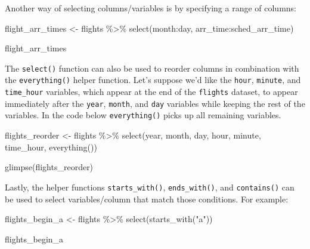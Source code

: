 \documentclass[
  letterpaper,
  DIV=11,
  numbers=noendperiod]{scrreprt}
\newenvironment{Shaded}{\begin{snugshade}}{\end{snugshade}}
\newcommand{\FunctionTok}[1]{\textcolor[rgb]{0.28,0.35,0.67}{#1}}
\newcommand{\NormalTok}[1]{\textcolor[rgb]{0.00,0.23,0.31}{#1}}
\newcommand{\OtherTok}[1]{\textcolor[rgb]{0.00,0.23,0.31}{#1}}
\newcommand{\SpecialCharTok}[1]{\textcolor[rgb]{0.37,0.37,0.37}{#1}}
\newcommand{\StringTok}[1]{\textcolor[rgb]{0.13,0.47,0.30}{#1}}
\theoremstyle{definition}
\theoremstyle{remark}
\begin{document}
Another way of selecting columns/variables is by specifying a range of
columns:

\begin{Shaded}
\begin{Highlighting}[]
\NormalTok{flight\_arr\_times }\OtherTok{\textless{}{-}}\NormalTok{ flights }\SpecialCharTok{\%\textgreater{}\%} 
  \FunctionTok{select}\NormalTok{(month}\SpecialCharTok{:}\NormalTok{day, arr\_time}\SpecialCharTok{:}\NormalTok{sched\_arr\_time)}

\NormalTok{flight\_arr\_times}
\end{Highlighting}
\end{Shaded}

The \texttt{select()} function can also be used to reorder columns in
combination with the \texttt{everything()} helper function. Let's
suppose we'd like the \texttt{hour}, \texttt{minute}, and
\texttt{time\_hour} variables, which appear at the end of the
\texttt{flights} dataset, to appear immediately after the \texttt{year},
\texttt{month}, and \texttt{day} variables while keeping the rest of the
variables. In the code below \texttt{everything()} picks up all
remaining variables.

\begin{Shaded}
\begin{Highlighting}[]
\NormalTok{flights\_reorder }\OtherTok{\textless{}{-}}\NormalTok{ flights }\SpecialCharTok{\%\textgreater{}\%} 
  \FunctionTok{select}\NormalTok{(year, month, day, hour, minute, time\_hour, }\FunctionTok{everything}\NormalTok{())}

\FunctionTok{glimpse}\NormalTok{(flights\_reorder)}
\end{Highlighting}
\end{Shaded}

Lastly, the helper functions \texttt{starts\_with()},
\texttt{ends\_with()}, and \texttt{contains()} can be used to select
variables/column that match those conditions. For example:

\begin{Shaded}
\begin{Highlighting}[]
\NormalTok{flights\_begin\_a }\OtherTok{\textless{}{-}}\NormalTok{ flights }\SpecialCharTok{\%\textgreater{}\%} 
  \FunctionTok{select}\NormalTok{(}\FunctionTok{starts\_with}\NormalTok{(}\StringTok{"a"}\NormalTok{))}

\NormalTok{flights\_begin\_a}
\end{Highlighting}
\end{Shaded}
\end{document}
